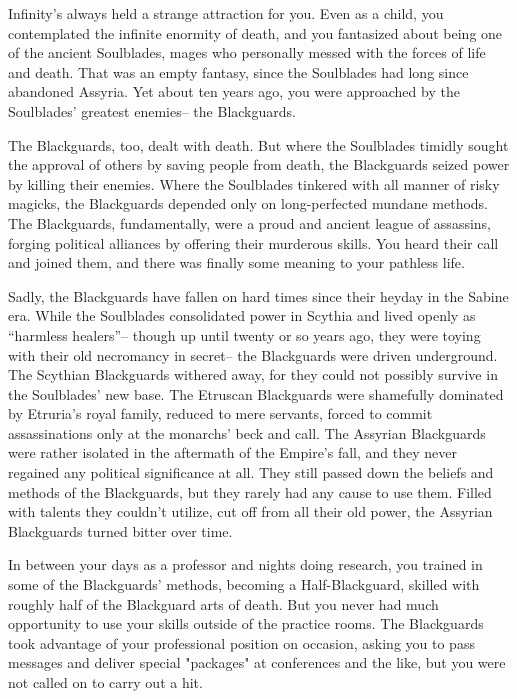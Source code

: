 \documentclass[char]{Kos}
\begin{document}
Infinity’s always held a strange attraction for you. Even as a child, you contemplated the infinite enormity of death, and you fantasized about being one of the ancient Soulblades, mages who personally messed with the forces of life and death. That was an empty fantasy, since the Soulblades had long since abandoned Assyria. Yet about ten years ago, you were approached by the Soulblades’ greatest enemies-- the Blackguards.

The Blackguards, too, dealt with death. But where the Soulblades timidly sought the approval of others by saving people from death, the Blackguards seized power by killing their enemies.  Where the Soulblades tinkered with all manner of risky magicks, the Blackguards depended only on long-perfected mundane methods. The Blackguards, fundamentally, were a proud and ancient league of assassins, forging political alliances by offering their murderous skills. You heard their call and joined them, and there was finally some meaning to your pathless life.

Sadly, the Blackguards have fallen on hard times since their heyday in the Sabine era. While the Soulblades consolidated power in Scythia and lived openly as “harmless healers”-- though up until twenty or so years ago, they were toying with their old necromancy in secret-- the Blackguards were driven underground. The Scythian Blackguards withered away, for they could not possibly survive in the Soulblades' new base. The Etruscan Blackguards were shamefully dominated by Etruria's royal family, reduced to mere servants, forced to commit assassinations only at the monarchs' beck and call. The Assyrian Blackguards were rather isolated in the aftermath of the Empire's fall, and they never regained any political significance at all. They still passed down the beliefs and methods of the Blackguards, but they rarely had any cause to use them. Filled with talents they couldn't utilize, cut off from all their old power, the Assyrian Blackguards turned bitter over time.

In between your days as a professor and nights doing research, you trained in some of the Blackguards' methods, becoming a Half-Blackguard, skilled with roughly half of the Blackguard arts of death. But you never had much opportunity to use your skills outside of the practice rooms. The Blackguards took advantage of your professional position on occasion, asking you to pass messages and deliver special "packages" at conferences and the like, but you were not called on to carry out a hit.
\end{document}
